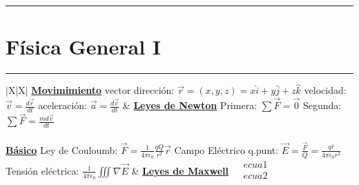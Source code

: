 \documentclass[../main.tex]{subfiles}
\begin{document}
\everymath{\displaystyle}
\vspace{0.2in}
\hrule
\vspace{0.2in}
\section{Física General I}
\vspace{0.1in}
\hrule
\begin{xltabular}{\textwidth}{|X|X|}
  \hline
  \underline{\textbf{Movimimiento}}
  \newline\newline
  vector dirección: $\vec{r} = (x,y,z) = x\hat{i} +y\hat{j}+z\hat{k}$\newline
  velocidad: $\vec{v} = \frac{d\vec{r}}{dt}$\newline
  aceleración: $\vec{a} = \frac{d\vec{v}}{dt}$
  \newline\newline
  &
  \underline{\textbf{Leyes de Newton}}
  \newline\newline
  Primera: $\sum \vec{F} = \vec{0}$\newline
  Segunda: $\sum \vec{F} = \frac{md\vec{v}}{dt}$\newline
  \newline\newline
  \\
  \hline
  \\
  \hline
  \underline{\textbf{Básico}}
  \newline
  Ley de Couloumb: $\vec{F} = \frac{1}{4\pi\epsilon_0}\frac{qQ}{r^2}\vec{r}$\newline
  Campo Eléctrico q.punt: $\vec{E} = \frac{\vec{F}}{Q} = \frac{q\hat{r}}{4\pi\epsilon_0 r^2}$\newline
  Tensión eléctrica: $\frac{1}{4\pi\epsilon_0} \iiint \nabla\vec{E}$
  \newline\newline
  &
  \underline{\textbf{Leyes de Maxwell}}
  $\begin{aligned}
       & ecua1 \\
       & ecua2 \\
    \end{aligned}$
  \newline\newline\\
  \hline
\end{xltabular}
\end{document}

